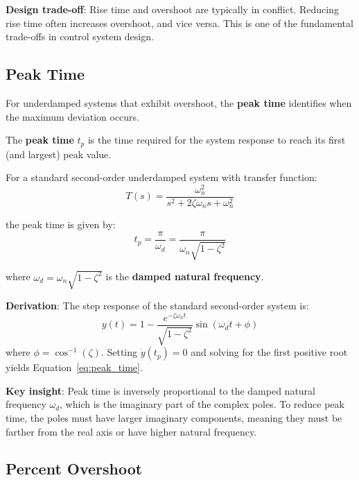 \textbf{Design trade-off}: Rise time and overshoot are typically in conflict. Reducing rise time often increases overshoot, and vice versa. This is one of the fundamental trade-offs in control system design.

\subsection{Peak Time}
\label{subsec:peak_time}

For underdamped systems that exhibit overshoot, the \textbf{peak time} identifies when the maximum deviation occurs.

\begin{definition}
The \textbf{peak time} $t_p$ is the time required for the system response to reach its first (and largest) peak value.
\end{definition}

For a standard second-order underdamped system with transfer function:
\begin{equation}
    T(s) = \frac{\omega_n^2}{s^2 + 2\zeta\omega_n s + \omega_n^2}
\end{equation}

the peak time is given by:
\begin{equation}
    \boxed{t_p = \frac{\pi}{\omega_d} = \frac{\pi}{\omega_n\sqrt{1-\zeta^2}}}
    \label{eq:peak_time}
\end{equation}

where $\omega_d = \omega_n\sqrt{1-\zeta^2}$ is the \textbf{damped natural frequency}.

\textbf{Derivation}: The step response of the standard second-order system is:
\begin{equation}
    y(t) = 1 - \frac{e^{-\zeta\omega_n t}}{\sqrt{1-\zeta^2}} \sin(\omega_d t + \phi)
\end{equation}
where $\phi = \cos^{-1}(\zeta)$. Setting $\dot{y}(t_p) = 0$ and solving for the first positive root yields Equation~\eqref{eq:peak_time}.

\textbf{Key insight}: Peak time is inversely proportional to the damped natural frequency $\omega_d$, which is the imaginary part of the complex poles. To reduce peak time, the poles must have larger imaginary components, meaning they must be farther from the real axis or have higher natural frequency.

\subsection{Percent Overshoot}
\label{subsec:overshoot}

